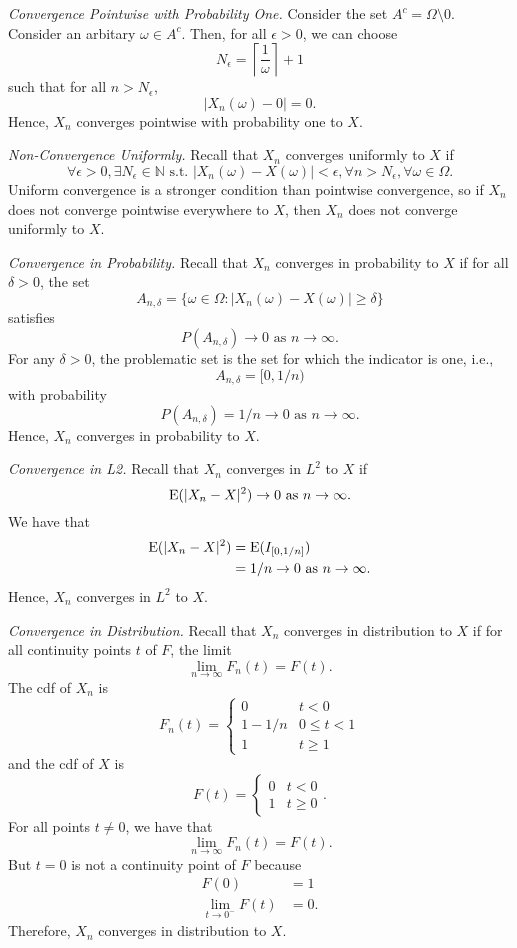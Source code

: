 \documentclass[titlepage]{article}
\begin{document}
\textit{Convergence Pointwise with Probability One.} Consider the set $A^{c} = \Omega \setminus 0$. Consider an arbitary $\omega \in A^{c}$. Then, for all $\epsilon > 0$, we can choose 
$$N_{\epsilon} = \left\lceil \frac{1}{\omega} \right\rceil + 1$$
such that for all $n > N_{\epsilon}$,
$$|X_{n}(\omega) - 0| = 0.$$
Hence, $X_{n}$ converges pointwise with probability one to $X$.

\textit{Non-Convergence Uniformly.} Recall that $X_{n}$ converges uniformly to $X$ if
$$\forall \epsilon > 0, \exists N_{\epsilon} \in \mathbb{N} \text{ s.t. } |X_{n}(\omega) - X(\omega)| < \epsilon, \forall n > N_{\epsilon}, \forall \omega \in \Omega.$$
Uniform convergence is a stronger condition than pointwise convergence, so if $X_{n}$ does not converge pointwise everywhere to $X$, then $X_{n}$ does not converge uniformly to $X$.

\textit{Convergence in Probability.} Recall that $X_{n}$ converges in probability to $X$ if for all $\delta > 0$, the set
$$A_{n,\delta} = \{\omega \in \Omega: |X_{n}(\omega) - X(\omega)| \geq \delta\}$$
satisfies
$$P(A_{n,\delta}) \to 0 \text{ as } n \to \infty.$$
For any $\delta > 0$, the problematic set is the set for which the indicator is one, i.e., 
$$A_{n,\delta} = [0, 1/n)$$
with probability 
$$P(A_{n,\delta}) = 1/n \to 0 \text{ as } n \to \infty.$$
Hence, $X_{n}$ converges in probability to $X$.

\textit{Convergence in L2.} Recall that $X_{n}$ converges in $L^{2}$ to $X$ if
$$\text{E}(|X_{n} - X|^{2}) \to 0 \text{ as } n \to \infty.$$
We have that 
\begin{align*}
    \text{E}(|X_{n} - X|^{2}) &= \text{E}(I_{[0, 1/n]}) \\
                        &= 1/n \to 0 \text{ as } n \to \infty.
\end{align*}
Hence, $X_{n}$ converges in $L^{2}$ to $X$.

\textit{Convergence in Distribution.} Recall that $X_{n}$ converges in distribution to $X$ if for all continuity points $t$ of $F$, the limit 
$$\lim_{n \to \infty}F_{n}(t) = F(t).$$
The cdf of $X_{n}$ is 
$$F_{n}(t) = \begin{cases} 0 & t < 0 \\ 1 - 1/n & 0 \leq t < 1 \\ 1 & t \geq 1 \end{cases}$$
and the cdf of $X$ is 
$$F(t) = \begin{cases} 0 & t < 0 \\ 1 & t \geq 0 \end{cases}.$$
For all points $t \neq 0$, we have that
$$\lim_{n \to \infty}F_{n}(t) = F(t).$$
But $t = 0$ is not a continuity point of $F$ because 
\begin{align*}
                      F(0) &= 1 \\
    \lim_{t \to 0^{-}}F(t) &= 0.
\end{align*}
Therefore, $X_{n}$ converges in distribution to $X$.
\end{document}
